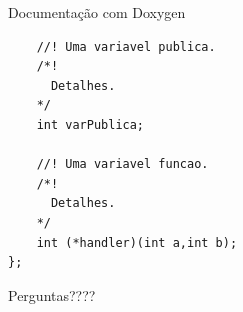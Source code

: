 \documentclass[12pt,table,xcolor={dvipsnames}]{beamer}
\begin{document}
\begin{frame}[fragile]{Documentação com Doxygen}
\begin{lstlisting}
    //! Uma variavel publica.
    /*!
      Detalhes.
    */
    int varPublica;

    //! Uma variavel funcao.
    /*!
      Detalhes.
    */
    int (*handler)(int a,int b);
};
\end{lstlisting}
\end{frame}

{
\begin{frame}

{\LARGE Perguntas????}

\end{frame}
}
\end{document}
